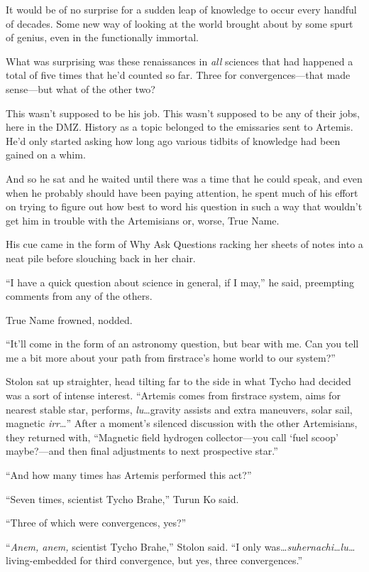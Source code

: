 It would be of no surprise for a sudden leap of knowledge to occur every handful of decades. Some new way of looking at the world brought about by some spurt of genius, even in the functionally immortal.

What was surprising was these renaissances in \emph{all} sciences that had happened a total of five times that he'd counted so far. Three for convergences—that made sense—but what of the other two?

This wasn't supposed to be his job. This wasn't supposed to be any of their jobs, here in the DMZ. History as a topic belonged to the emissaries sent to Artemis. He'd only started asking how long ago various tidbits of knowledge had been gained on a whim.

And so he sat and he waited until there was a time that he could speak, and even when he probably should have been paying attention, he spent much of his effort on trying to figure out how best to word his question in such a way that wouldn't get him in trouble with the Artemisians or, worse, True Name.

His cue came in the form of Why Ask Questions racking her sheets of notes into a neat pile before slouching back in her chair.

``I have a quick question about science in general, if I may,'' he said, preempting comments from any of the others.

True Name frowned, nodded.

``It'll come in the form of an astronomy question, but bear with me. Can you tell me a bit more about your path from firstrace's home world to our system?''

Stolon sat up straighter, head tilting far to the side in what Tycho had decided was a sort of intense interest. ``Artemis comes from firstrace system, aims for nearest stable star, performs, \emph{lu}\ldots gravity assists and extra maneuvers, solar sail, magnetic \emph{irr}\ldots{}'' After a moment's silenced discussion with the other Artemisians, they returned with, ``Magnetic field hydrogen collector—you call `fuel scoop' maybe?—and then final adjustments to next prospective star.''

``And how many times has Artemis performed this act?''

``Seven times, scientist Tycho Brahe,'' Turun Ko said.

``Three of which were convergences, yes?''

``\emph{Anem, anem,} scientist Tycho Brahe,'' Stolon said. ``I only was\ldots{}\emph{suhernachi\ldots lu\ldots{}} living-embedded for third convergence, but yes, three convergences.''

